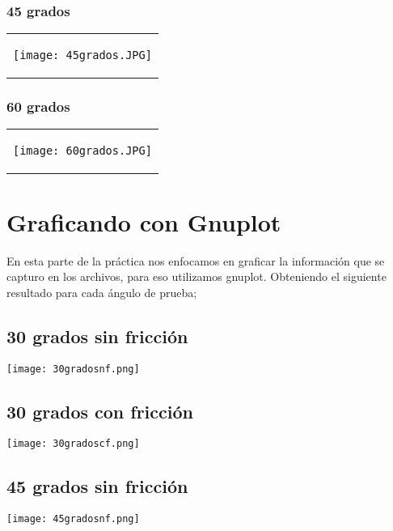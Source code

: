 \documentclass[10pt]{article}
\begin{document}
\subsubsection{45 grados}
\begin{tabular}{c}
\begin{center}
   \texttt{[image: 45grados.JPG]}
\end{center}
\end{tabular}

\subsubsection{60 grados}
\begin{tabular}{c}
\begin{center}
   \texttt{[image: 60grados.JPG]}
\end{center}
\end{tabular}




\newpage


\section{Graficando con Gnuplot}
En esta parte de la práctica nos enfocamos en graficar la información que se capturo en los archivos, para eso utilizamos gnuplot.
\space
Obteniendo el siguiente resultado para cada ángulo de prueba;


\subsection{30 grados sin fricción}
\begin{center}
   \texttt{[image: 30gradosnf.png]}
\end{center}

\subsection{30 grados con fricción}
\begin{center}
   \texttt{[image: 30gradoscf.png]}
\end{center}


\subsection{45 grados sin fricción}
\begin{center}
   \texttt{[image: 45gradosnf.png]}
\end{center}
\end{document}
